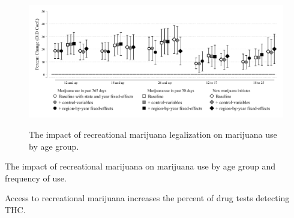 \documentclass[12pt]{article}%
\begin{document}
\begin{figure}[h]
    \caption{The impact of recreational marijuana legalization on marijuana use by age group.}
    \begin{minipage}{\linewidth}
      \includegraphics[width=\linewidth]{../output/plots/bw-main_recreational_figure_for_paper_robust_part_a.pdf}
       \label{fig:main_coef_plot}
    \end{minipage}
\end{figure}

\begin{table}[h]\centering
    \begin{adjustbox}{width=.85\textwidth}
    \centering
      \begin{threeparttable}
        \caption{The impact of recreational marijuana on marijuana use by age group and frequency of use.}
        \label{tab:mj_use_add_rm_disp}
      \end{threeparttable}
     \end{adjustbox}
\end{table}

\begin{table}[t]\centering
    \begin{adjustbox}{width=.6\textwidth}
    \centering
      \begin{threeparttable}
        \caption{Access to recreational marijuana increases the percent of drug tests detecting THC.}
                    \label{tab:quest_regs}
      \end{threeparttable}
     \end{adjustbox}
\end{table}
\end{document}

